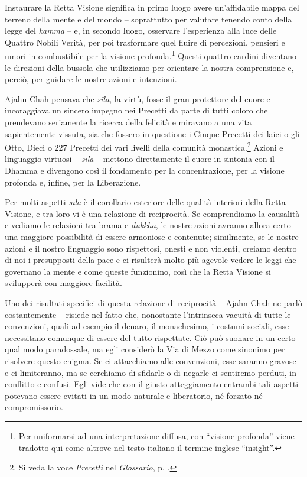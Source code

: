 Instaurare la Retta Visione significa in primo luogo avere un'affidabile
mappa del terreno della mente e del mondo -- soprattutto per valutare
tenendo conto della legge del \emph{kamma} -- e, in secondo luogo,
osservare l'esperienza alla luce delle Quattro Nobili Verità, per poi
trasformare quel fluire di percezioni, pensieri e umori in combustibile
per la visione profonda.\footnote{Per uniformarsi ad una interpretazione
  diffusa, con ``visione profonda'' viene tradotto qui come altrove nel
  testo italiano il termine inglese ``insight''.} Questi quattro cardini
diventano le direzioni della bussola che utilizziamo per orientare la
nostra comprensione e, perciò, per guidare le nostre azioni e
intenzioni.

Ajahn Chah pensava che \emph{sīla}, la virtù, fosse il gran protettore
del cuore e incoraggiava un sincero impegno nei Precetti da parte di
tutti coloro che prendevano seriamente la ricerca della felicità e
miravano a una vita sapientemente vissuta, sia che fossero in questione
i Cinque Precetti dei laici o gli Otto, Dieci o 227 Precetti dei vari
livelli della comunità monastica.\footnote{Si veda la voce
  \emph{Precetti} nel \emph{Glossario}, p. \pageref{glossary-precetti}.} Azioni e linguaggio virtuosi --
\emph{sīla} -- mettono direttamente il cuore in sintonia con il Dhamma e
divengono così il fondamento per la concentrazione, per la visione
profonda e, infine, per la Liberazione.

Per molti aspetti \emph{sīla} è il corollario esteriore delle qualità
interiori della Retta Visione, e tra loro vi è una relazione di
reciprocità. Se comprendiamo la causalità e vediamo le relazioni tra
brama e \emph{dukkha}, le nostre azioni avranno allora certo una
maggiore possibilità di essere armoniose e contenute; similmente, se le
nostre azioni e il nostro linguaggio sono rispettosi, onesti e non
violenti, creiamo dentro di noi i presupposti della pace e ci risulterà
molto più agevole vedere le leggi che governano la mente e come queste
funzionino, così che la Retta Visione si svilupperà con maggiore
facilità.

Uno dei risultati specifici di questa relazione di reciprocità -- Ajahn
Chah ne parlò costantemente -- risiede nel fatto che, nonostante
l'intrinseca vacuità di tutte le convenzioni, quali ad esempio il
denaro, il monachesimo, i costumi sociali, esse necessitano comunque di
essere del tutto rispettate. Ciò può suonare in un certo qual modo
paradossale, ma egli considerò la Via di Mezzo come sinonimo per
risolvere questo enigma. Se ci attacchiamo alle convenzioni, esse
saranno gravose e ci limiteranno, ma se cerchiamo di sfidarle o di
negarle ci sentiremo perduti, in conflitto e confusi. Egli vide che con
il giusto atteggiamento entrambi tali aspetti potevano essere evitati in
un modo naturale e liberatorio, né forzato né compromissorio.

